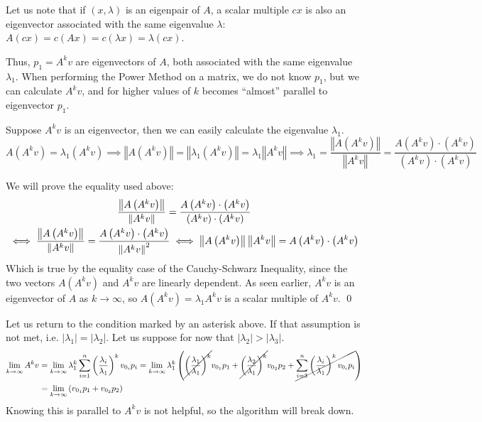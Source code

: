 \documentclass{article}
\begin{document}
Let us note that if $(x,\lambda)$ is an eigenpair of $A$, a scalar multiple $cx$ is also an eigenvector associated with the same eigenvalue $\lambda$: $A(cx)=c(Ax)=c(\lambda x)=\lambda(cx)$.

Thus, $p_1=A^kv$ are eigenvectors of $A$, both associated with the same eigenvalue $\lambda_1$. When performing the Power Method on a matrix, we do not know $p_1$, but we can calculate $A^kv$, and for higher values of $k$ becomes ``almost'' parallel to eigenvector $p_1$.

Suppose $A^kv$ is an eigenvector, then we can easily calculate the eigenvalue $\lambda_1$.
\begin{equation*}
    A\left(A^kv\right)=\lambda_1 \left(A^k v\right)
	\implies \left\Vert A\left(A^kv\right)\right \Vert=\left\Vert\lambda_1 \left(A^k v\right)\right\Vert=\lambda_1 \left\Vert A^k v\right\Vert
	\implies \lambda_1=\frac{\left\Vert A \left(A^k v\right)\right\Vert}{\left\Vert A^k v\right\Vert}
	=\boxed{\frac{A \left(A^k v\right)\cdot \left(A^k v\right)}{\left(A^k v\right)\cdot \left(A^k v\right)}}
\end{equation*}
\begin{tcolorbox}[colback=blue!5!white,colframe=blue!75!black,parbox=false]
	We will prove the equality used above:
	\begin{gather}
		\frac{\left\Vert A \left(A^k v\right)\right\Vert}{\left\Vert A^k v\right\Vert}
		=\frac{A \left(A^k v\right)\cdot \left(A^k v\right)}{\left(A^k v\right)\cdot \left(A^k v\right)} \\
		\iff \frac{\left\Vert A \left(A^k v\right)\right\Vert}{\left\Vert A^k v\right\Vert}
		=\frac{A \left(A^k v\right)\cdot \left(A^k v\right)}{\left\Vert A^k v\right\Vert^2}
		\iff \left\Vert A \left(A^k v\right)\right\Vert \left\Vert A^kv\right\Vert=A \left(A^k v\right) \cdot \left(A^k v\right) \notag
	\end{gather}
	Which is true by the equality case of the Cauchy-Schwarz Inequality, since the two vectors $A \left(A^kv\right)$ and $A^kv$ are linearly dependent. As seen earlier, $A^kv$ is an eigenvector of $A$ as $k\to\infty$, so $A \left(A^k v\right)=\lambda_1 A^k v$ is a scalar multiple of $A^k v$. \qed
\end{tcolorbox}

Let us return to the condition marked by an asterisk above. If that assumption is not met, i.e. $\left|\lambda_1\right|=\left|\lambda_2\right|$. Let us suppose for now that $\left|\lambda_2\right|>\left|\lambda_3\right|$.
\begin{align*}
    \lim_{k\to\infty}A^k v
	&=\lim_{k\to\infty}\lambda_1^k \sum_{i=1}^{n}\left(\frac{\lambda_i}{\lambda_1}\right)^k v_{0_i}p_i
	=\lim_{k\to\infty}\lambda_1^k \left(\cancel{\left(\frac{\lambda_1}{\lambda_1}\right)^k} v_{0_1}p_1+\cancel{\left(\frac{\lambda_2}{\lambda_1}\right)^k}v_{0_2}p_2+\cancel{\sum_{i=3}^{n}\left(\frac{\lambda_i}{\lambda_1}\right)^k v_{0_i}p_i}\right) \\
	&=\lim_{k\to\infty}\left(v_{0_1}p_1+v_{0_2}p_2\right)
\end{align*}
Knowing this is parallel to $A^kv$ is not helpful, so the algorithm will break down.
\end{document}
